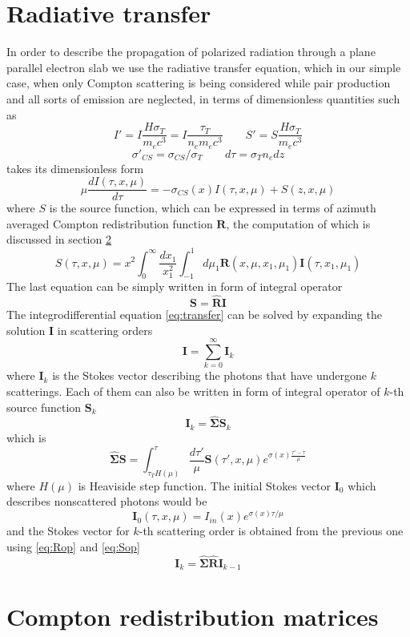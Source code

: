 \documentclass[iop, usenatbib]{emulateapj}
\newcommand{\be}{\begin{equation}}
\newcommand{\ee}{\end{equation}}
\begin{document}
\section{Radiative transfer}
In order to describe the propagation of polarized radiation through a plane parallel electron slab we use the radiative transfer equation, which in our  simple case, when only Compton scattering is being considered while pair production and all sorts of emission are neglected, in terms of dimensionless quantities such as $$
 I'=I \frac{H \sigma_T}{m_e c^3}=I \frac{\tau_T}{n_e m_e c^3} \qquad S'=S \frac{H \sigma_T}{m_e c^3}$$$$
\sigma'_{CS}=\sigma_{CS}/\sigma_T \qquad d\tau= \sigma_T n_e dz $$
takes its dimensionless form 
\be
\label{eq:transfer}
\mu \frac{d I (\tau,x,\mu)}{d\tau} = -  \sigma_{CS}(x)I(\tau,x,\mu) + S(z,x,\mu) 
\ee
where $S$ is the source function, which can be expressed in terms of azimuth averaged Compton redistribution function $\bm{R}$, the 
computation of which is discussed in section \ref{redistr} 
\be
\label{eq:Source}
S(\tau,x,\mu)= x^2 \int_0^\infty \frac{dx_1}{x_1^2} \int_{-1}^1 d\mu_1 
\bm{R}(x,\mu,x_1,\mu_1)\bm{I}(\tau,x_1,\mu_1)
\ee
The last equation can be simply written in form of integral operator
\be
\label{eq:Rop}
\bm{S}=\hat{\bm{R}}\bm{I}
\ee
 The integrodifferential equation \eqref{eq:transfer} can be solved by expanding the solution $\bm{I}$ in scattering orders
 \be
 \bm{I}=\sum_{k=0}^\infty \bm{I}_k
\ee
 where $\bm{I}_k$ is the Stokes vector describing the photons  that have undergone $k$ scatterings. Each of them can also be written in form of integral operator  of $k$-th source function $\bm{S}_k$
\be
\label{eq:Sop}
 \bm{I}_k=\hat{\bm{\Sigma}}\bm{S}_k
\ee
which is
 \be
 \hat{\bm{\Sigma}}\bm{S}=\int_{\tau_TH(\mu)}^\tau \frac{d\tau'}\mu \bm{S}(\tau',x,\mu) e^{\sigma(x)\frac{\tau'-\tau}\mu}
\ee 
where $H(\mu)$ is Heaviside step function. The initial Stokes vector $\bm{I}_0$ which describes nonscattered photons would be
\be
\bm{I}_0(\tau,x,\mu)=I_{in}(x) e^{\sigma(x)\tau/\mu}
\ee 
and the Stokes vector for $k$-th scattering order is obtained from the previous one using \eqref{eq:Rop} and \eqref{eq:Sop}
\be
\bm{I}_k=\hat{\bm{\Sigma}}\hat{\bm{R}}\bm{I}_{k-1}
\ee


\section{Compton redistribution matrices} \label{redistr}
\end{document}
